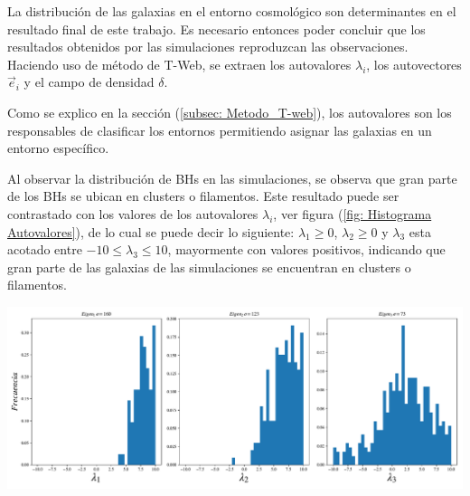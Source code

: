 La distribución de las galaxias en el entorno cosmológico son determinantes en el resultado final de este trabajo. Es necesario entonces poder concluir que los resultados obtenidos por las simulaciones reproduzcan las observaciones. Haciendo uso de método de T-Web, se extraen los autovalores $\lambda_{i}$, los autovectores $\vec{e}_{i}$ y el campo de densidad $\delta$. 

Como se explico en la sección (\ref{subsec: Metodo_T-web}),  los autovalores son los responsables de clasificar los entornos permitiendo asignar las galaxias en un entorno específico. 


Al observar la distribución de BHs en las simulaciones, se observa que gran parte de los BHs se ubican en clusters o filamentos. Este resultado puede ser contrastado con los valores de los autovalores $\lambda_{i}$, ver figura (\ref{fig: Histograma Autovalores}), de lo cual se puede decir lo siguiente:  $\lambda_{1}\geq 0$,  $\lambda_{2}\geq 0$ y $\lambda_{3}$ esta acotado entre $-10 \leq \lambda_{3}\leq 10$, mayormente con valores positivos, indicando que gran parte de las galaxias de las simulaciones se encuentran en clusters o filamentos.
%
\begin{center}
\includegraphics[scale=.4]{./figures/6_Resultados/cosmo01/histograma_autovalores.pdf}
\label{fig: Histograma Autovalores}
\end{center}
%




